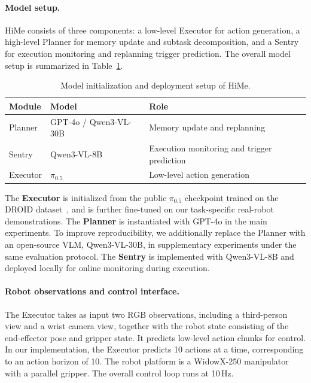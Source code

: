 \paragraph{Model setup.}
HiMe consists of three components: a low-level Executor for action generation, a high-level Planner for memory update and subtask decomposition, and a Sentry for execution monitoring and replanning trigger prediction. The overall model setup is summarized in Table~\ref{tab:model_setup}.

\begin{table}[H]
\centering
\caption{Model initialization and deployment setup of HiMe.}
\label{tab:model_setup}
\begin{tabular}{lll}
\toprule
\textbf{Module} & \textbf{Model} & \textbf{Role} \\
\midrule
Planner & GPT-4o / Qwen3-VL-30B & Memory update and replanning \\
Sentry & Qwen3-VL-8B & Execution monitoring and trigger prediction \\
Executor & $\pi_{0.5}$ & Low-level action generation \\
\bottomrule
\end{tabular}
\end{table}

The \textbf{Executor} is initialized from the public $\pi_{0.5}$ checkpoint trained on the DROID dataset~\citep{Khazatsky2024DROIDAL}, and is further fine-tuned on our task-specific real-robot demonstrations. The \textbf{Planner} is instantiated with GPT-4o in the main experiments. To improve reproducibility, we additionally replace the Planner with an open-source VLM, Qwen3-VL-30B, in supplementary experiments under the same evaluation protocol. The \textbf{Sentry} is implemented with Qwen3-VL-8B and deployed locally for online monitoring during execution.

\paragraph{Robot observations and control interface.}
The Executor takes as input two RGB observations, including a third-person view and a wrist camera view, together with the robot state consisting of the end-effector pose and gripper state. It predicts low-level action chunks for control. In our implementation, the Executor predicts 10 actions at a time, corresponding to an action horizon of 10. The robot platform is a WidowX-250 manipulator with a parallel gripper. The overall control loop runs at 10\,Hz.

